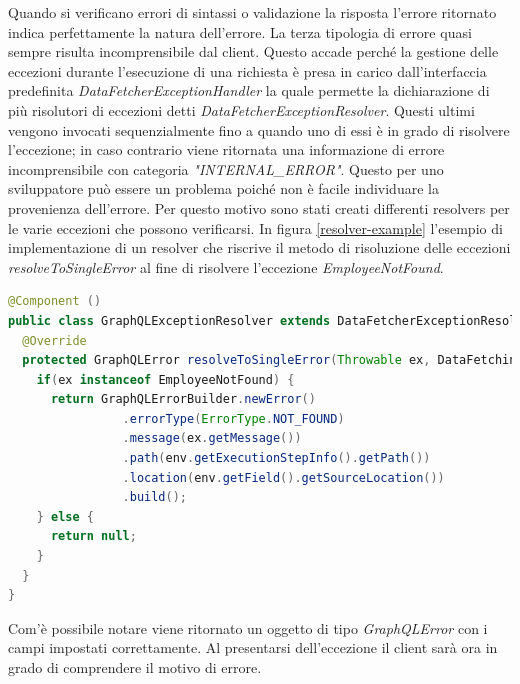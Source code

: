 Quando si verificano errori di sintassi o validazione la risposta l'errore ritornato indica perfettamente la natura dell'errore. La terza tipologia di errore quasi sempre risulta incomprensibile dal client. Questo accade perché la gestione delle eccezioni durante l'esecuzione di una richiesta è presa in carico dall'interfaccia predefinita \textit{DataFetcherExceptionHandler} la quale permette la dichiarazione di più risolutori di eccezioni detti \textit{DataFetcherExceptionResolver}. Questi ultimi vengono invocati sequenzialmente fino a quando uno di essi è in grado di risolvere l'eccezione; in caso contrario viene ritornata una informazione di errore incomprensibile con categoria \textit{"INTERNAL\_ERROR"}. Questo per uno sviluppatore può essere un problema poiché non è facile individuare la provenienza dell'errore. Per questo motivo sono stati creati differenti resolvers per le varie eccezioni che possono verificarsi. In figura \ref{resolver-example} l'esempio di implementazione di un resolver che riscrive il metodo di risoluzione delle eccezioni \textit{resolveToSingleError} al fine di risolvere l'eccezione \textit{EmployeeNotFound}.
\begin{lstlisting}[language=Java, morecomment={[s][\color{DarkOrchid}]{@}{\ }},  morecomment={[s][\color{OliveGreen}]{"}{"}},]
@Component ()
public class GraphQLExceptionResolver extends DataFetcherExceptionResolverAdapter {
  @Override
  protected GraphQLError resolveToSingleError(Throwable ex, DataFetchingEnvironment env) {
    if(ex instanceof EmployeeNotFound) {
      return GraphQLErrorBuilder.newError()
                .errorType(ErrorType.NOT_FOUND)
                .message(ex.getMessage())
                .path(env.getExecutionStepInfo().getPath())
                .location(env.getField().getSourceLocation())
                .build();
    } else {
      return null;
    }
  }
}
\end{lstlisting}
Com'è possibile notare viene ritornato un oggetto di tipo \textit{GraphQLError} con i campi impostati correttamente. Al presentarsi dell'eccezione il client sarà ora in grado di comprendere il motivo di errore.
